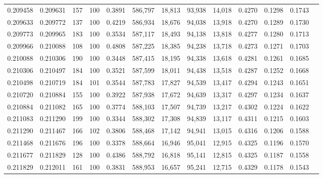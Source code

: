 \begin{tabular}{rrrrrrrrrrrrr}
0.209458 & 0.209631 &   157 & 100 &                                     0.3891 & 586,797 &  18,813 &  93,938 &  14,018 & 0.4270 & 0.1298 & 0.1743 \\
0.209633 & 0.209772 &   137 & 100 &                                     0.4219 & 586,934 &  18,676 &  94,038 &  13,918 & 0.4270 & 0.1289 & 0.1730 \\
0.209773 & 0.209965 &   183 & 100 &                                     0.3534 & 587,117 &  18,493 &  94,138 &  13,818 & 0.4277 & 0.1280 & 0.1713 \\
0.209966 & 0.210088 &   108 & 100 &                                     0.4808 & 587,225 &  18,385 &  94,238 &  13,718 & 0.4273 & 0.1271 & 0.1703 \\
0.210088 & 0.210306 &   190 & 100 &                                     0.3448 & 587,415 &  18,195 &  94,338 &  13,618 & 0.4281 & 0.1261 & 0.1685 \\
0.210306 & 0.210497 &   184 & 100 &                                     0.3521 & 587,599 &  18,011 &  94,438 &  13,518 & 0.4287 & 0.1252 & 0.1668 \\
0.210498 & 0.210719 &   184 & 101 &                                     0.3544 & 587,783 &  17,827 &  94,539 &  13,417 & 0.4294 & 0.1243 & 0.1651 \\
0.210720 & 0.210884 &   155 & 100 &                                     0.3922 & 587,938 &  17,672 &  94,639 &  13,317 & 0.4297 & 0.1234 & 0.1637 \\
0.210884 & 0.211082 &   165 & 100 &                                     0.3774 & 588,103 &  17,507 &  94,739 &  13,217 & 0.4302 & 0.1224 & 0.1622 \\
0.211083 & 0.211290 &   199 & 100 &                                     0.3344 & 588,302 &  17,308 &  94,839 &  13,117 & 0.4311 & 0.1215 & 0.1603 \\
0.211290 & 0.211467 &   166 & 102 &                                     0.3806 & 588,468 &  17,142 &  94,941 &  13,015 & 0.4316 & 0.1206 & 0.1588 \\
0.211468 & 0.211676 &   196 & 100 &                                     0.3378 & 588,664 &  16,946 &  95,041 &  12,915 & 0.4325 & 0.1196 & 0.1570 \\
0.211677 & 0.211829 &   128 & 100 &                                     0.4386 & 588,792 &  16,818 &  95,141 &  12,815 & 0.4325 & 0.1187 & 0.1558 \\
0.211829 & 0.212011 &   161 & 100 &                                     0.3831 & 588,953 &  16,657 &  95,241 &  12,715 & 0.4329 & 0.1178 & 0.1543 \\

\end{tabular}
